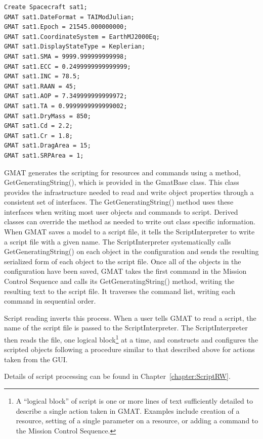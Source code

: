 \lstset{numbers=left,firstnumber=1}
\begin{lstlisting}[caption={Script Listing for a Spacecraft},label={listing:BasicMissionSpacecraft}]
Create Spacecraft sat1;
GMAT sat1.DateFormat = TAIModJulian;
GMAT sat1.Epoch = 21545.000000000;
GMAT sat1.CoordinateSystem = EarthMJ2000Eq;
GMAT sat1.DisplayStateType = Keplerian;
GMAT sat1.SMA = 9999.999999999998;
GMAT sat1.ECC = 0.2499999999999999;
GMAT sat1.INC = 78.5;
GMAT sat1.RAAN = 45;
GMAT sat1.AOP = 7.349999999999972;
GMAT sat1.TA = 0.9999999999999002;
GMAT sat1.DryMass = 850;
GMAT sat1.Cd = 2.2;
GMAT sat1.Cr = 1.8;
GMAT sat1.DragArea = 15;
GMAT sat1.SRPArea = 1;
\end{lstlisting}
\lstset{numbers=none}

\noindent GMAT generates the scripting for resources and commands using a method,
GetGeneratingString(), which is provided in the GmatBase class.  This class provides the
infrastructure needed to read and write object properties through a consistent set of interfaces.
The GetGeneratingString() method uses these interfaces when writing most user objects and commands
to script.  Derived classes can override the method as needed to write out class specific
information.
When GMAT saves a model to a script file, it tells the ScriptInterpreter to write a script file with
a given name.  The ScriptInterpreter systematically calls GetGeneratingString() on each object in
the configuration and sends the resulting serialized form of each object to the script file.  Once
all of the objects in the configuration have been saved, GMAT takes the first command in the Mission
Control Sequence and calls its GetGeneratingString() method, writing the resulting text to the
script file.  It traverses the command list, writing each command in sequential order.

Script reading inverts this process.  When a user tells GMAT to read a script, the name of the
script file is passed to the ScriptInterpreter.  The ScriptInterpreter then reads the file, one
logical block\footnote{A ``logical block'' of script is one or more lines of text sufficiently
detailed to describe a single action taken in GMAT.  Examples include creation of a resource,
setting of a single parameter on a resource, or adding a command to the Mission Control Sequence.}
at a time, and constructs and configures the scripted objects following a procedure similar to that
described above for actions taken from the GUI.

Details of script processing can be found in Chapter~\ref{chapter:ScriptRW}.

